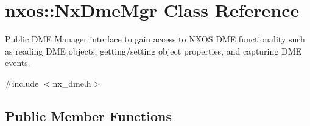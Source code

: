 \hypertarget{classnxos_1_1_nx_dme_mgr}{}\section{nxos\+:\+:Nx\+Dme\+Mgr Class Reference}
\label{classnxos_1_1_nx_dme_mgr}


Public D\+ME Manager interface to gain access to N\+X\+OS D\+ME functionality such as reading D\+ME objects, getting/setting object properties, and capturing D\+ME events.  




{\ttfamily \#include $<$nx\+\_\+dme.\+h$>$}

\subsection*{Public Member Functions}
